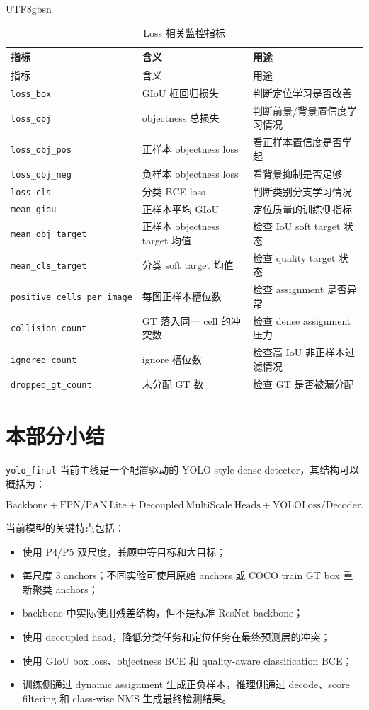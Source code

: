 \documentclass[11pt,a4paper]{article}
\newcommand{\code}[1]{\texttt{#1}}
\begin{document}
\begin{CJK*}{UTF8}{gbsn}
\begin{longtable}{lll}
\caption{Loss 相关监控指标}\\
\toprule
指标 & 含义 & 用途 \\
\midrule
\endfirsthead
\toprule
指标 & 含义 & 用途 \\
\midrule
\endhead
\code{loss\_box} & GIoU 框回归损失 & 判断定位学习是否改善 \\
\code{loss\_obj} & objectness 总损失 & 判断前景/背景置信度学习情况 \\
\code{loss\_obj\_pos} & 正样本 objectness loss & 看正样本置信度是否学起 \\
\code{loss\_obj\_neg} & 负样本 objectness loss & 看背景抑制是否足够 \\
\code{loss\_cls} & 分类 BCE loss & 判断类别分支学习情况 \\
\code{mean\_giou} & 正样本平均 GIoU & 定位质量的训练侧指标 \\
\code{mean\_obj\_target} & 正样本 objectness target 均值 & 检查 IoU soft target 状态 \\
\code{mean\_cls\_target} & 分类 soft target 均值 & 检查 quality target 状态 \\
\code{positive\_cells\_per\_image} & 每图正样本槽位数 & 检查 assignment 是否异常 \\
\code{collision\_count} & GT 落入同一 cell 的冲突数 & 检查 dense assignment 压力 \\
\code{ignored\_count} & ignore 槽位数 & 检查高 IoU 非正样本过滤情况 \\
\code{dropped\_gt\_count} & 未分配 GT 数 & 检查 GT 是否被漏分配 \\
\bottomrule
\end{longtable}

\section{本部分小结}

\code{yolo\_final} 当前主线是一个配置驱动的 YOLO-style dense detector，其结构可以概括为：

\[
  \mathrm{Backbone}
  +
  \mathrm{FPN/PAN\ Lite}
  +
  \mathrm{Decoupled\ MultiScale\ Heads}
  +
  \mathrm{YOLOLoss/Decoder}.
\]

当前模型的关键特点包括：

\begin{itemize}
  \item 使用 P4/P5 双尺度，兼顾中等目标和大目标；
  \item 每尺度 3 anchors；不同实验可使用原始 anchors 或 COCO train GT box 重新聚类 anchors；
  \item backbone 中实际使用残差结构，但不是标准 ResNet backbone；
  \item 使用 decoupled head，降低分类任务和定位任务在最终预测层的冲突；
  \item 使用 GIoU box loss、objectness BCE 和 quality-aware classification BCE；
  \item 训练侧通过 dynamic assignment 生成正负样本，推理侧通过 decode、score filtering 和 class-wise NMS 生成最终检测结果。
\end{itemize}


\end{CJK*}
\end{document}
